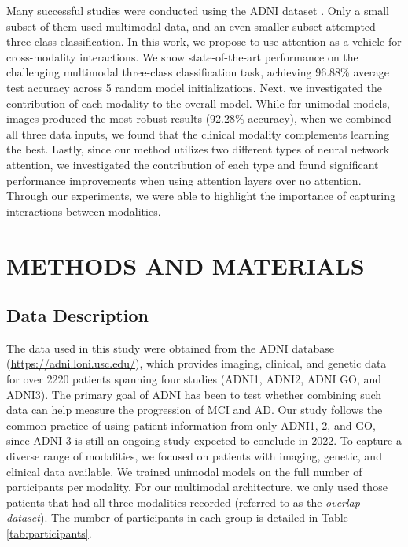 \documentclass[11pt]{article}
\begin{document}
Many successful studies were conducted using the ADNI dataset \cite{mueller2005ways}. Only a small subset of them used multimodal data, and an even smaller subset attempted three-class classification. In this work, we propose to use attention as a vehicle for cross-modality interactions. We show state-of-the-art performance on the challenging multimodal three-class classification task, achieving 96.88\% average test accuracy across 5 random model initializations. Next, we investigated the contribution of each modality to the overall model. While for unimodal models, images produced the most robust results (92.28\% accuracy), when we combined all three data inputs, we found that the clinical modality complements learning the best. Lastly, since our method utilizes two different types of neural network attention, we investigated the contribution of each type and found significant performance improvements when using attention layers over no attention. Through our experiments, we were able to highlight the importance of capturing interactions between modalities. 
 

\section*{METHODS AND MATERIALS}
\subsection*{Data Description}

The data used in this study were obtained from the ADNI database (\url{https://adni.loni.usc.edu/}), which provides imaging, clinical, and genetic data for over 2220 patients spanning four studies (ADNI1, ADNI2, ADNI GO, and ADNI3). The primary goal of ADNI has been to test whether combining such data can help measure the progression of MCI and AD. Our study follows the common practice of using patient information from only ADNI1, 2, and GO, since ADNI 3 is still an ongoing study expected to conclude in 2022. To capture a diverse range of modalities, we focused on patients with imaging, genetic, and clinical data available. We trained unimodal models on the full number of participants per modality. For our multimodal architecture, we only used those patients that had all three modalities recorded (referred to as the \textit{overlap dataset}). The number of participants in each group is detailed in Table \ref{tab:participants}. 
\end{document}
